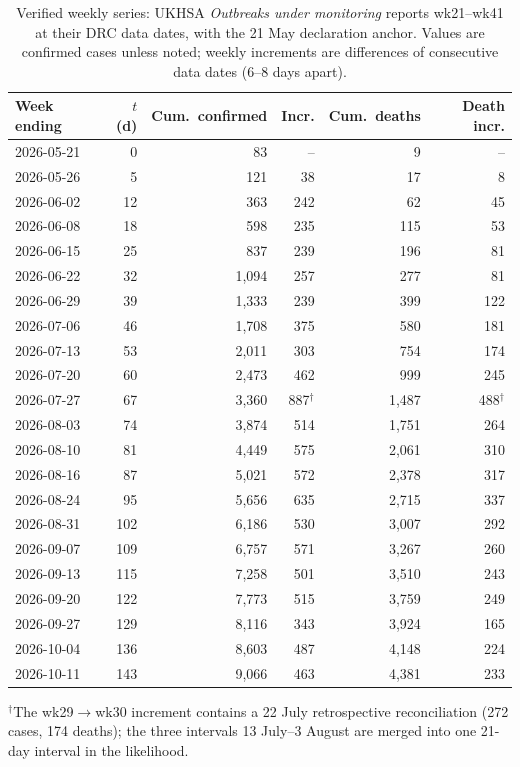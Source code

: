 \documentclass[10pt]{plos}
\begin{document}
\begin{table}[htbp]
\centering
\caption{Verified weekly series: UKHSA \emph{Outbreaks under monitoring}
reports wk21--wk41 at their DRC data dates, with the 21 May declaration
anchor. Values are confirmed cases unless noted; weekly increments are
differences of consecutive data dates (6--8 days apart).}
\label{tab:weekly}
\footnotesize
\begin{tabular}{lrrrrr}
\toprule
Week ending & $t$ (d) & Cum.\ confirmed & Incr. & Cum.\ deaths & Death incr. \\
\midrule
2026-05-21 & 0 & 83 & -- & 9 & -- \\
2026-05-26 & 5 & 121 & 38 & 17 & 8 \\
2026-06-02 & 12 & 363 & 242 & 62 & 45 \\
2026-06-08 & 18 & 598 & 235 & 115 & 53 \\
2026-06-15 & 25 & 837 & 239 & 196 & 81 \\
2026-06-22 & 32 & 1{,}094 & 257 & 277 & 81 \\
2026-06-29 & 39 & 1{,}333 & 239 & 399 & 122 \\
2026-07-06 & 46 & 1{,}708 & 375 & 580 & 181 \\
2026-07-13 & 53 & 2{,}011 & 303 & 754 & 174 \\
2026-07-20 & 60 & 2{,}473 & 462 & 999 & 245 \\
2026-07-27 & 67 & 3{,}360 & 887$^\dagger$ & 1{,}487 & 488$^\dagger$ \\
2026-08-03 & 74 & 3{,}874 & 514 & 1{,}751 & 264 \\
2026-08-10 & 81 & 4{,}449 & 575 & 2{,}061 & 310 \\
2026-08-16 & 87 & 5{,}021 & 572 & 2{,}378 & 317 \\
2026-08-24 & 95 & 5{,}656 & 635 & 2{,}715 & 337 \\
2026-08-31 & 102 & 6{,}186 & 530 & 3{,}007 & 292 \\
2026-09-07 & 109 & 6{,}757 & 571 & 3{,}267 & 260 \\
2026-09-13 & 115 & 7{,}258 & 501 & 3{,}510 & 243 \\
2026-09-20 & 122 & 7{,}773 & 515 & 3{,}759 & 249 \\
2026-09-27 & 129 & 8{,}116 & 343 & 3{,}924 & 165 \\
2026-10-04 & 136 & 8{,}603 & 487 & 4{,}148 & 224 \\
2026-10-11 & 143 & 9{,}066 & 463 & 4{,}381 & 233 \\
\bottomrule
\end{tabular}

\vspace{2pt}
\par\footnotesize $^\dagger$The wk29$\to$wk30 increment contains a 22 July
retrospective reconciliation (272 cases, 174 deaths); the three intervals
13 July--3 August are merged into one 21-day interval in the likelihood.
\end{table}
\end{document}
